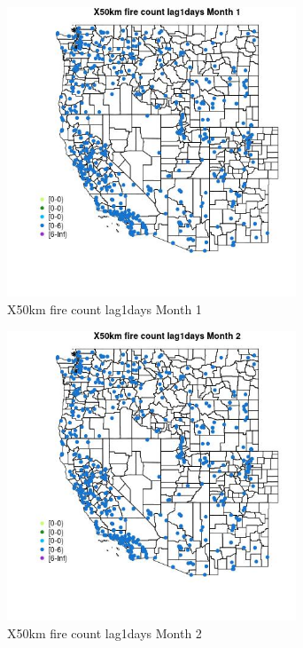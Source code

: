 \begin{figure} 
\centering  
\includegraphics[width=0.77\textwidth]{Code_Outputs/Report_ML_input_PM25_Step4_part_e_de_duplicated_aves_compiled_2019-05-14wNAs_MapObsMo1X50km_fire_count_lag1days.jpg} 
\caption{\label{fig:Report_ML_input_PM25_Step4_part_e_de_duplicated_aves_compiled_2019-05-14wNAsMapObsMo1X50km_fire_count_lag1days}X50km fire count lag1days Month 1} 
\end{figure} 
 

\begin{figure} 
\centering  
\includegraphics[width=0.77\textwidth]{Code_Outputs/Report_ML_input_PM25_Step4_part_e_de_duplicated_aves_compiled_2019-05-14wNAs_MapObsMo2X50km_fire_count_lag1days.jpg} 
\caption{\label{fig:Report_ML_input_PM25_Step4_part_e_de_duplicated_aves_compiled_2019-05-14wNAsMapObsMo2X50km_fire_count_lag1days}X50km fire count lag1days Month 2} 
\end{figure} 
 

